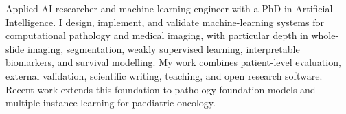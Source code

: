 
\begin{cvparagraph}
Applied AI researcher and machine learning engineer with a PhD in Artificial Intelligence. I design, implement, and validate machine-learning systems for computational pathology and medical imaging, with particular depth in whole-slide imaging, segmentation, weakly supervised learning, interpretable biomarkers, and survival modelling. My work combines patient-level evaluation, external validation, scientific writing, teaching, and open research software. Recent work extends this foundation to pathology foundation models and multiple-instance learning for paediatric oncology.
\end{cvparagraph}
